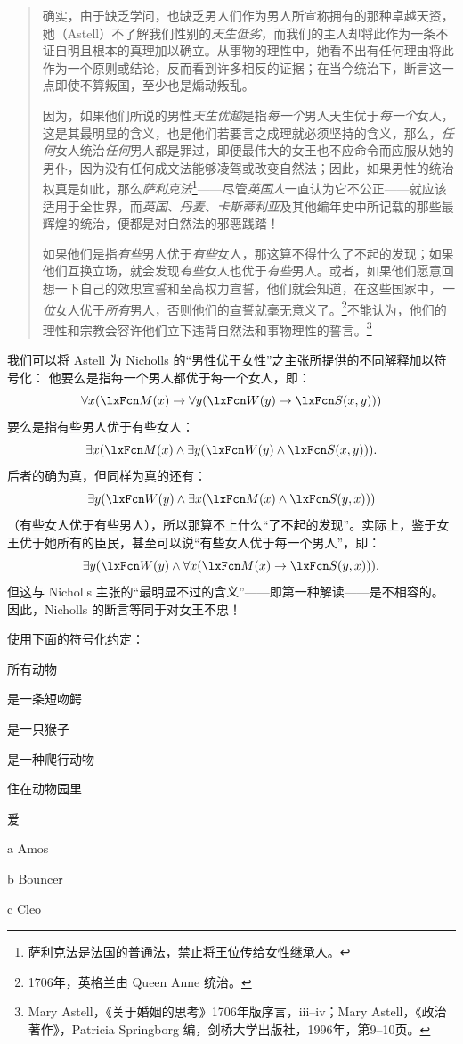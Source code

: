 \begin{quotation}
确实，由于缺乏学问，也缺乏男人们作为男人所宣称拥有的那种卓越天资，她（Astell）不了解我们性别的\textit{天生低劣}，而我们的主人却将此作为一条不证自明且根本的真理加以确立。从事物的理性中，她看不出有任何理由将此作为一个原则或结论，反而看到许多相反的证据；在当今统治下，断言这一点即使不算叛国，至少也是煽动叛乱。

因为，如果他们所说的男性\textit{天生优越}是指\textit{每一个}男人天生优于\textit{每一个}女人，这是其最明显的含义，也是他们若要言之成理就必须坚持的含义，那么，\textit{任何}女人统治\textit{任何}男人都是罪过，即便最伟大的女王也不应命令而应服从她的男仆，因为没有任何成文法能够凌驾或改变自然法；因此，如果男性的统治权真是如此，那么\textit{萨利克法}\footnote{萨利克法是法国的普通法，禁止将王位传给女性继承人。}——尽管\textit{英国人}一直认为它不公正——就应该适用于全世界，而\textit{英国、丹麦、卡斯蒂利亚}及其他编年史中所记载的那些最辉煌的统治，便都是对自然法的邪恶践踏！

如果他们是指\textit{有些}男人优于\textit{有些}女人，那这算不得什么了不起的发现；如果他们互换立场，就会发现\textit{有些}女人也优于\textit{有些}男人。或者，如果他们愿意回想一下自己的效忠宣誓和至高权力宣誓，他们就会知道，在这些国家中，\textit{一位}女人优于\textit{所有}男人，否则他们的宣誓就毫无意义了。\footnote{1706年，英格兰由 Queen Anne 统治。}不能认为，他们的理性和宗教会容许他们立下违背自然法和事物理性的誓言。\footnote{Mary Astell，《关于婚姻的思考》1706年版序言，iii--iv；Mary Astell，《政治著作》，Patricia Springborg 编，剑桥大学出版社，1996年，第9--10页。}
\end{quotation}


我们可以将 Astell 为 Nicholls 的“男性优于女性”之主张所提供的不同解释加以符号化：
他要么是指每一个男人都优于每一个女人，即：
\[
\forall x(\atom{M}{x} \eif \forall y(\atom{W}{y} \eif \atom{S}{x,y}))
\]
要么是指有些男人优于有些女人：
\[
\exists x(\atom{M}{x} \eand \exists y(\atom{W}{y} \eand \atom{S}{x,y})).
\]
后者的确为真，但同样为真的还有：
\[
\exists y(\atom{W}{y} \eand \exists x(\atom{M}{x} \eand \atom{S}{y,x}))
\]
（有些女人优于有些男人），所以那算不上什么“了不起的发现”。实际上，鉴于女王优于她所有的臣民，甚至可以说“有些女人优于每一个男人”，即：
\[
\exists y(\atom{W}{y} \land \forall x(\atom{M}{x} \eif \atom{S}{y,x})).
\]
但这与 Nicholls 主张的“最明显不过的含义”——即第一种解读——是不相容的。因此，Nicholls 的断言等同于对女王不忠！

\practiceproblems
\solutions
\problempart
使用下面的符号化约定：


\begin{ekey}
\item[\text{论域}] 所有动物
\item[\atom{A}{x}]  是一条短吻鳄
\item[\atom{M}{x}]  是一只猴子
\item[\atom{R}{x}]  是一种爬行动物
\item[\atom{Z}{x}]  住在动物园里
\item[\atom{L}{x,y}]  爱 
\item[a] Amos
\item[b] Bouncer
\item[c] Cleo
\end{ekey}


